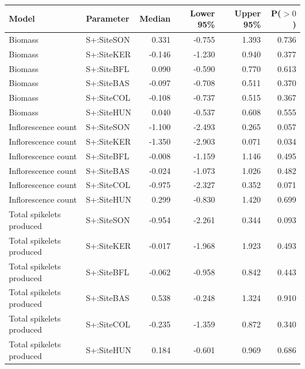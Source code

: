 \begin{tabular}{llrrrr}
\hline
Model & Parameter & Median & Lower 95\% & Upper 95\% & P($>0$) \\ 
\hline
Biomass & S+:SiteSON & 0.331 & -0.755 & 1.393 & 0.736 \\ 
Biomass & S+:SiteKER & -0.146 & -1.230 & 0.940 & 0.377 \\ 
Biomass & S+:SiteBFL & 0.090 & -0.590 & 0.770 & 0.613 \\ 
Biomass & S+:SiteBAS & -0.097 & -0.708 & 0.511 & 0.370 \\ 
Biomass & S+:SiteCOL & -0.108 & -0.737 & 0.515 & 0.367 \\ 
Biomass & S+:SiteHUN & 0.040 & -0.537 & 0.608 & 0.555 \\ 

Inflorescence count & S+:SiteSON & -1.100 & -2.493 & 0.265 & 0.057 \\ 
Inflorescence count & S+:SiteKER & -1.350 & -2.903 & 0.071 & 0.034 \\ 
Inflorescence count & S+:SiteBFL & -0.008 & -1.159 & 1.146 & 0.495 \\ 
Inflorescence count & S+:SiteBAS & -0.024 & -1.073 & 1.026 & 0.482 \\ 
Inflorescence count & S+:SiteCOL & -0.975 & -2.327 & 0.352 & 0.071 \\ 
Inflorescence count & S+:SiteHUN & 0.299 & -0.830 & 1.420 & 0.699 \\ 

Total spikelets produced & S+:SiteSON & -0.954 & -2.261 & 0.344 & 0.093 \\ 
Total spikelets produced & S+:SiteKER & -0.017 & -1.968 & 1.923 & 0.493 \\ 
Total spikelets produced & S+:SiteBFL & -0.062 & -0.958 & 0.842 & 0.443 \\ 
Total spikelets produced & S+:SiteBAS & 0.538 & -0.248 & 1.324 & 0.910 \\ 
Total spikelets produced & S+:SiteCOL & -0.235 & -1.359 & 0.872 & 0.340 \\ 
Total spikelets produced & S+:SiteHUN & 0.184 & -0.601 & 0.969 & 0.686 \\ 


\hline
\end{tabular}